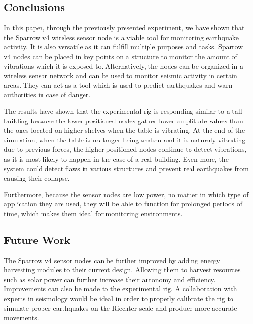 \subsection{Conclusions}

In this paper, through the previously presented experiment, we have shown 
that the Sparrow v4 wireless sensor node is a viable tool for monitoring 
earthquake activity. It is also versatile as it can fulfill multiple purposes 
and tasks. Sparrow v4 nodes can be placed in key points on a structure to monitor 
the amount of vibrations which it is exposed to. Alternatively, the nodes can 
be organized in a wireless sensor network and can be used to monitor seismic activity 
in certain areas. They can act as a tool which is used to predict earthquakes and 
warn authorities in case of danger.

The results have shown that the experimental rig is responding similar to a tall building because 
the lower positioned nodes gather lower amplitude values than the ones located on higher shelves 
when the table is vibrating. At the end of the simulation, when the table is no longer being shaken 
and it is naturaly vibrating due to previous forces, the higher positioned nodes continue 
to detect vibrations, as it is most likely to happen in the case of a real building. Even more, the 
system could detect flaws in various structures and prevent real earthquakes from causing their collapse.

Furthermore, because the sensor nodes are low power, no matter in which type of application they 
are used, they will be able to function for prolonged periods of time, which makes them ideal 
for monitoring environments.

\subsection{Future Work}
The Sparrow v4 sensor nodes can be further improved by adding energy harvesting modules to their 
current design. Allowing them to harvest resources such as solar power can further increase 
their autonomy and efficiency. Improvements can also be made to the experimental rig. A collaboration 
with experts in seismology would be ideal in order to properly calibrate the rig to simulate 
proper earthquakes on the Riechter scale and produce more accurate movements.
